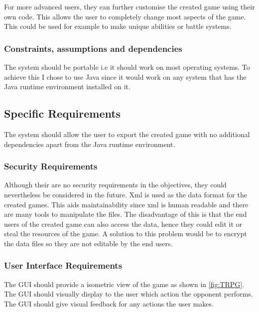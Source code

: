 For more advanced users, they can further customise the created game using their own code. This allows the user to completely change most aspects of the game. This could be used for example to make unique abilities or battle systems.


\subsubsection{Constraints, assumptions and dependencies}
The system should be portable i.e it should work on most operating systems.  To achieve this I chose to use Java  since it would work on any system that has the Java runtime environment installed on it. 



\subsection{Specific Requirements}
The system should allow the user to export the created game with no additional dependencies apart from the Java runtime environment. 

\subsubsection{Security Requirements}
Although their are no security requirements in the objectives, they could nevertheless  be considered in the future. Xml is used as the data format for the created games. This aids maintainability since xml is human readable and there are many tools to manipulate the files. The disadvantage of this is that the end users of the created game can also access the data, hence they could edit it or steal the resources of the game. A solution to this problem would be to encrypt the data files so they are not editable by the end users.    

\subsubsection{User Interface Requirements}
The GUI should provide a isometric view of the game as shown in \ref{fig:TRPG}. The GUI should visually display to the user  which action the opponent performs. The GUI should give visual feedback for any actions the user makes.



